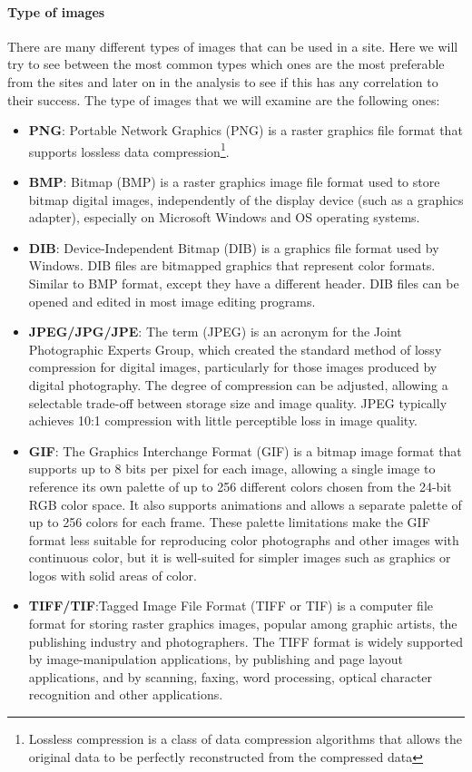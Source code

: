 \documentclass{article}
\begin{document}
\paragraph{Type of images}
There are many different types of images that can be used in a site. Here we will try to see between the most common types which ones are the most preferable from the sites and later on in the analysis to see if this has any correlation to their success. The type of images that we will examine are the following ones:
\begin{itemize}
\item \textbf{PNG}: Portable Network Graphics (PNG) is a raster graphics file format that supports lossless data compression\footnote{Lossless compression is a class of data compression algorithms that allows the original data to be perfectly reconstructed from the compressed data}.
\item \textbf{BMP}: Bitmap (BMP) is a raster graphics image file format used to store bitmap digital images, independently of the display device (such as a graphics adapter), especially on Microsoft Windows and OS operating systems.
\item \textbf{DIB}: Device-Independent Bitmap (DIB) is a graphics file format used by Windows. DIB files are bitmapped graphics that represent color formats. Similar to BMP format, except they have a different header. DIB files can be opened and edited in most image editing programs.
\item \textbf{JPEG/JPG/JPE}: The term (JPEG) is an acronym for the Joint Photographic Experts Group, which created the standard method of lossy compression for digital images, particularly for those images produced by digital photography. The degree of compression can be adjusted, allowing a selectable trade-off between storage size and image quality. JPEG typically achieves 10:1 compression with little perceptible loss in image quality.
\item \textbf{GIF}: The Graphics Interchange Format (GIF) is a bitmap image format that supports up to 8 bits per pixel for each image, allowing a single image to reference its own palette of up to 256 different colors chosen from the 24-bit RGB color space. It also supports animations and allows a separate palette of up to 256 colors for each frame. These palette limitations make the GIF format less suitable for reproducing color photographs and other images with continuous color, but it is well-suited for simpler images such as graphics or logos with solid areas of color.
\item \textbf{TIFF/TIF}:Tagged Image File Format (TIFF or TIF) is a computer file format for storing raster graphics images, popular among graphic artists, the publishing industry and photographers. The TIFF format is widely supported by image-manipulation applications, by publishing and page layout applications, and by scanning, faxing, word processing, optical character recognition and other applications.
\end{itemize}
\end{document}

